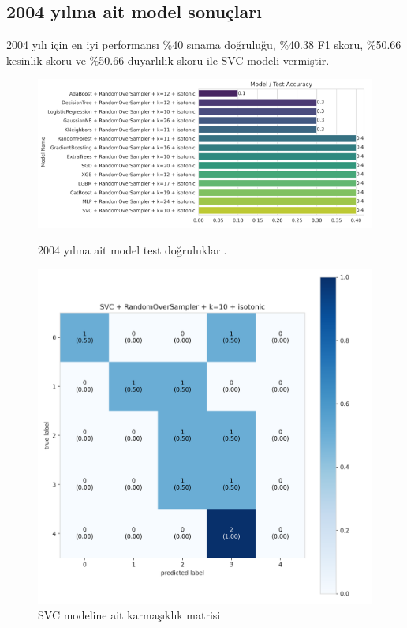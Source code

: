 \newpage

\subsection{2004 yılına ait model sonuçları}
2004 yılı için en iyi performansı \%40 sınama doğruluğu,  \%40.38 F1 skoru, \%50.66 kesinlik skoru ve \%50.66 duyarlılık skoru ile SVC modeli vermiştir.

\begin{figure}[ht]
\centering
\begin{minipage}[b]{0.6\textwidth}
    \centering
    \includegraphics[width=\textwidth]{2004.png}
    \caption{2004 yılına ait model test doğrulukları.}
    \label{fig:resim1}
\end{minipage}
\hfill
\begin{minipage}[b]{0.6\textwidth}
    \centering
    \includegraphics[width=\textwidth]{2004_cm.png}
    \caption{SVC modeline ait karmaşıklık matrisi}
    \label{fig:resim2}
\end{minipage}
\end{figure}

